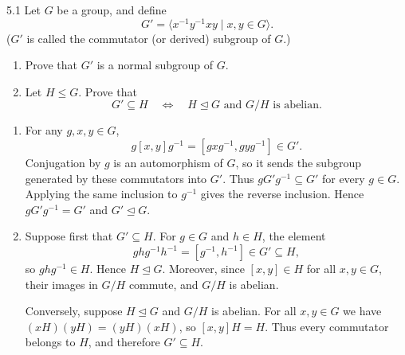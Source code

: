 \documentclass[11pt,oneside]{article}
\begin{document}
\begin{problem}{5.1}
Let $G$ be a group, and define
\[
G'=\langle x^{-1}y^{-1}xy\mid x,y\in G\rangle.
\]
($G'$ is called the commutator (or derived) subgroup of $G$.)
\begin{enumerate}[label=(\alph*),leftmargin=2.5em,itemsep=0.2em,topsep=0.35em]
\item Prove that $G'$ is a normal subgroup of $G$.
\item Let $H\le G$. Prove that
\[
G'\subseteq H\quad\Longleftrightarrow\quad H\trianglelefteq G\text{ and }G/H\text{ is abelian}.
\]
\end{enumerate}
\end{problem}
\begin{solution}
\begin{enumerate}[label=(\alph*),leftmargin=2.5em,itemsep=0.55em,topsep=0.2em]
\item For any $g,x,y\in G$,
\[
g[x,y]g^{-1}=[gxg^{-1},gyg^{-1}]\in G'.
\]
Conjugation by $g$ is an automorphism of $G$, so it sends the subgroup generated by these commutators into $G'$. Thus $gG'g^{-1}\subseteq G'$ for every $g\in G$. Applying the same inclusion to $g^{-1}$ gives the reverse inclusion. Hence $gG'g^{-1}=G'$ and $G'\trianglelefteq G$.
\item Suppose first that $G'\subseteq H$. For $g\in G$ and $h\in H$, the element
\[
ghg^{-1}h^{-1}=[g^{-1},h^{-1}]\in G'\subseteq H,
\]
so $ghg^{-1}\in H$. Hence $H\trianglelefteq G$. Moreover, since $[x,y]\in H$ for all $x,y\in G$, their images in $G/H$ commute, and $G/H$ is abelian.

Conversely, suppose $H\trianglelefteq G$ and $G/H$ is abelian. For all $x,y\in G$ we have $(xH)(yH)=(yH)(xH)$, so $[x,y]H=H$. Thus every commutator belongs to $H$, and therefore $G'\subseteq H$.
\end{enumerate}
\end{solution}
\end{document}
